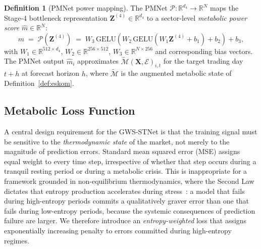 \documentclass[11pt,a4paper]{article}  %
\newcommand{\R}{\mathbb{R}}
\theoremstyle{plain}
\theoremstyle{definition}
\newtheorem{definition}{Definition}[section]
\theoremstyle{remark}
\begin{document}
\begin{definition}[PMNet power mapping]
\label{def:pmnet}
The PMNet $\mathcal{P}:\R^{d_4}\to\R^{N}$ maps the Stage-4
bottleneck representation $\mathbf{Z}^{(4)}\in\R^{d_4}$ to a
sector-level \emph{metabolic power score} $\hat{m}\in\R^{N}$:
\begin{equation}
   \hat{m} \;=\; \mathcal{P}(\mathbf{Z}^{(4)})
   \;=\; W_3\,\mathrm{GELU}\!\left(W_2\,
   \mathrm{GELU}(W_1\mathbf{Z}^{(4)} + b_1) + b_2\right) + b_3,
   \label{eq:pmnet}
\end{equation}
with $W_1\in\R^{512\times d_4}$, $W_2\in\R^{256\times 512}$,
$W_3\in\R^{N\times 256}$ and corresponding bias vectors. The PMNet
output $\hat{m}_i$ approximates
$\widetilde{\mathcal{M}}(\mathbf{X},\mathcal{E})_{i,t}$
for the target trading day $t+h$ at forecast horizon $h$, where
$\widetilde{\mathcal{M}}$ is the augmented metabolic state of
Definition~\ref{def:eskom}.
\end{definition}

\subsection{Metabolic Loss Function}
\label{subsec:loss}

A central design requirement for the GWS-STNet is that the training
signal must be sensitive to the \emph{thermodynamic state} of the
market, not merely to the magnitude of prediction errors. Standard
mean squared error (MSE) assigns equal weight to every time step,
irrespective of whether that step occurs during a tranquil resting
period or during a metabolic crisis. This is inappropriate for a
framework grounded in non-equilibrium thermodynamics, where the
Second Law dictates that entropy production accelerates during
stress~\cite{Prigogine1977}: a model that fails during high-entropy
periods commits a qualitatively graver error than one that fails
during low-entropy periods, because the systemic consequences of
prediction failure are larger. We therefore introduce an
\emph{entropy-weighted} loss that assigns exponentially increasing
penalty to errors committed during high-entropy regimes.
\end{document}
